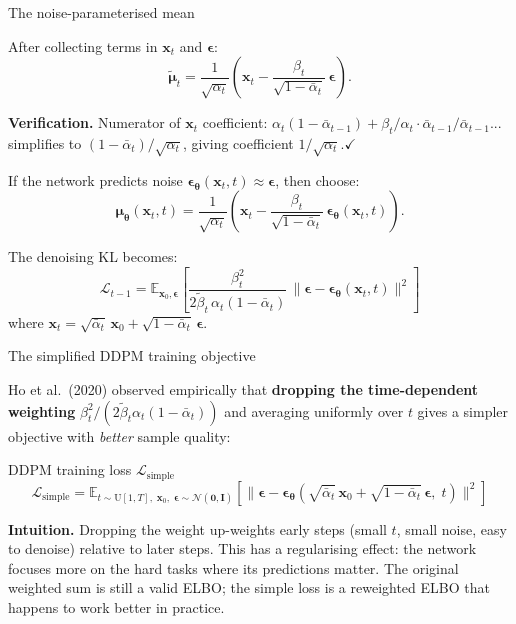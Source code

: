 \documentclass[aspectratio=169,11pt]{beamer}
\newcommand{\E}{\mathbb{E}}
\newcommand{\Norm}{\mathcal{N}}
\newcommand{\bx}{\bm{x}}
\newcommand{\beps}{\bm{\epsilon}}
\newcommand{\bmu}{\bm{\mu}}
\newcommand{\btheta}{\bm{\theta}}
\begin{document}
\begin{frame}{The noise-parameterised mean}

After collecting terms in $\bx_t$ and $\beps$:
\[
  \tilde{\bmu}_t
  = \frac{1}{\sqrt{\alpha_t}}\!\left(
      \bx_t - \frac{\beta_t}{\sqrt{1-\bar\alpha_t}}\,\beps
    \right).
\]

\textbf{Verification.}
Numerator of $\bx_t$ coefficient:
$\alpha_t(1-\bar\alpha_{t-1}) + \beta_t/\alpha_t \cdot \bar\alpha_{t-1}/\bar\alpha_{t-1}$...
simplifies to $(1-\bar\alpha_t)/\sqrt{\alpha_t}$, giving coefficient $1/\sqrt{\alpha_t}$.\quad$\checkmark$

\medskip
If the network predicts noise
$\beps_{\btheta}(\bx_t,t)\approx\beps$, then choose:
\[
\bmu_{\btheta}(\bx_t,t)
= \frac{1}{\sqrt{\alpha_t}}\!\left(
    \bx_t - \frac{\beta_t}{\sqrt{1-\bar\alpha_t}}\,\beps_{\btheta}(\bx_t,t)
  \right).
\]

The denoising KL becomes:
\[
  \mathcal{L}_{t-1}
  = \E_{\bx_0,\beps}\!\left[
    \frac{\beta_t^2}{2\tilde\beta_t\,\alpha_t(1-\bar\alpha_t)}\,
    \bigl\|\beps - \beps_{\btheta}(\bx_t,t)\bigr\|^2
  \right]
\]
where $\bx_t = \sqrt{\bar\alpha_t}\,\bx_0 + \sqrt{1-\bar\alpha_t}\,\beps$.
\end{frame}

\begin{frame}{The simplified DDPM training objective}

Ho et al.\ (2020) observed empirically that \textbf{dropping the time-dependent
weighting} $\beta_t^2/(2\tilde\beta_t\alpha_t(1-\bar\alpha_t))$ and averaging
uniformly over $t$ gives a simpler objective with \emph{better} sample quality:

\begin{block}{DDPM training loss $\mathcal{L}_{\mathrm{simple}}$}
\[
\boxed{
\mathcal{L}_{\mathrm{simple}}
= \E_{t\sim\mathrm{U}[1,T],\;\bx_0,\;\beps\sim\Norm(\bm{0},\mathbf{I})}\!\left[
  \bigl\|\beps
         - \beps_{\btheta}\!\left(
             \sqrt{\bar\alpha_t}\,\bx_0
             + \sqrt{1-\bar\alpha_t}\,\beps,\;t
           \right)\bigr\|^2
\right]
}
\]
\end{block}

\medskip
\textbf{Intuition.}
Dropping the weight up-weights early steps (small $t$, small noise, easy
to denoise) relative to later steps. This has a regularising effect:
the network focuses more on the hard tasks where its predictions matter.
The original weighted sum is still a valid ELBO; the simple loss is a
reweighted ELBO that happens to work better in practice.
\end{frame}
\end{document}
